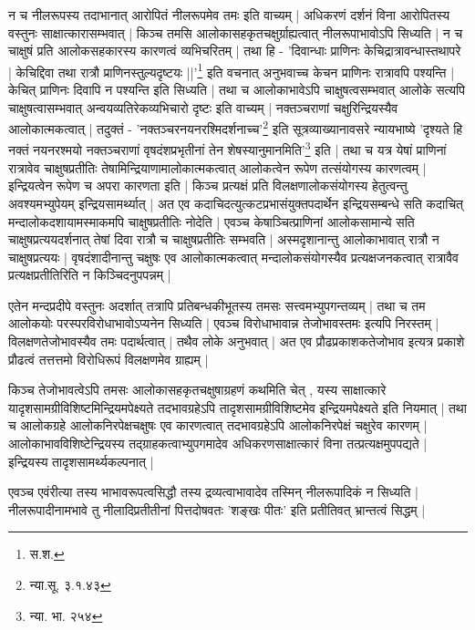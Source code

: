 न च नीलरूपस्य तदाभानात् आरोपितं नीलरूपमेव तमः इति वाच्यम् | अधिकरणं दर्शनं विना आरोपितस्य वस्तुनः साक्षात्कारासम्भवात् | किञ्च तमसि आलोकासहकृतचक्षुर्ग्राह्यत्वात् नीलरूपाभावोऽपि सिध्यति | न च चाक्षुषं प्रति आलोकसहकारस्य कारणत्वं व्यभिचरितम् | तथा हि - {\fontsize{11.7}{0}\selectfont\s 'दिवान्धाः प्राणिनः केचिद्रात्रावन्धास्तथापरे | केचिद्दिवा तथा रात्रौ प्राणिनस्तुल्यदृष्टयः ||'\footnote{स.श.}} इति वचनात् अनुभवाच्च केचन प्राणिनः रात्रावपि पश्यन्ति | केचित् प्राणिनः दिवापि न पश्यन्ति इति सिध्यति | तथा च आलोकाभावेऽपि चाक्षुषत्वसम्भवात् आलोके सत्यपि चाक्षुषत्वासम्भवात् अन्वयव्यतिरेकव्यभिचारो दृष्टः इति वाच्यम् | नक्तञ्चराणां चक्षुरिन्द्रियस्यैव आलोकात्मकत्वात् | तदुक्तं - {\fontsize{11.7}{0}\selectfont\s 'नक्तञ्चरनयनरश्मिदर्शनाच्च'\footnote{न्या.सू. ३.१.४३}} इति सूत्रव्याख्यानावसरे न्यायभाष्ये {\fontsize{11.7}{0}\selectfont\s 'दृश्यते हि नक्तं नयनरश्मयो नक्तञ्चराणां वृषदंशप्रभृतीनां तेन शेषस्यानुमानमिति'\footnote{न्या. भा. २५४}} इति | तथा च यत्र येषां प्राणिनां रात्रावेव चाक्षुषप्रतीतिः तेषामिन्द्रियाणामालोकात्मकत्वात् आलोकत्वेन रूपेण तत्संयोगस्य कारणत्वम् | इन्द्रियत्वेन रूपेण च अपरा कारणता इति | किञ्च प्रत्यक्षं प्रति विलक्षणालोकसंयोगस्य हेतुत्वन्तु अवश्यमभ्युपेयम् इन्द्रियसामर्थ्यात् | अत एव कदाचिदत्युत्कटप्रभासंयुक्तपदार्थेन इन्द्रियसम्बन्धे सति कदाचित् मन्दालोकदशायामस्माकमपि चाक्षुषप्रतीतिः नोदेति | एवञ्च केषाञ्चित्प्राणिनां आलोकसामान्ये सति चाक्षुषप्रत्ययदर्शनात् तेषां दिवा रात्रौ च चाक्षुषप्रतीतिः सम्भवति | अस्मदृशानान्तु आलोकाभावात् रात्रौ न चाक्षुषप्रत्ययः | वृषदंशादीनान्तु चक्षुषः एव आलोकात्मकत्वात् मन्दालोकसंयोगस्यैव प्रत्यक्षजनकत्वात् रात्रावैव प्रत्यक्षप्रतीतिरिति न किञ्चिदनुपपन्नम् | 

एतेन मन्दप्रदीपे वस्तुनः अदर्शात् तत्रापि प्रतिबन्धकीभूतस्य तमसः सत्त्वमभ्युपगन्तव्यम् | तथा च तम आलोकयोः परस्परविरोधाभावोऽप्यनेन सिध्यति | एवञ्च विरोधाभावान्न तेजोभावस्तमः इत्यपि निरस्तम् | विलक्षणतेजोभावस्यैव तमः पदार्थत्वात् | तथैव लोके अनुभवात् | अत एव प्रौढप्रकाशकतेजोभाव इत्यत्र प्रकाशे प्रौढत्वं तत्तत्तमो विरोधिरूपं विलक्षणमेव ग्राह्यम् |

किञ्च तेजोभावत्वेऽपि तमसः आलोकासहकृतचक्षुषाग्रहणं कथमिति चेत् , यस्य साक्षात्कारे यादृशसामग्रीविशिष्टमिन्द्रियमपेक्ष्यते तदभावग्रहेऽपि तादृशसामग्रीविशिष्टमेव इन्द्रियमपेक्ष्यते इति नियमात् | तथा च आलोकग्रहे आलोकनिरपेक्षचक्षुषः एव कारणत्वात् तदभावग्रहेऽपि आलोकनिरपेक्षं चक्षुरेव कारणम् | आलोकाभावविशिष्टेन्द्रियस्य तद्ग्राहकत्वाभ्युपगमादेव अधिकरणसाक्षात्कारं विना तत्प्रत्यक्षमुपपद्यते | इन्द्रियस्य तादृशसामर्थ्यकल्पनात् |

एवञ्च एवंरीत्या तस्य भाभावरूपत्वसिद्धौ तस्य द्रव्यत्वाभावादेव तस्मिन् नीलरूपादिकं न सिध्यति | नीलरूपादीनामभावे तु नीलादिप्रतीतीनां पित्तदोषवतः 'शङ्खः पीतः' इति प्रतीतिवत् भ्रान्तत्वं सिद्धम् |





















